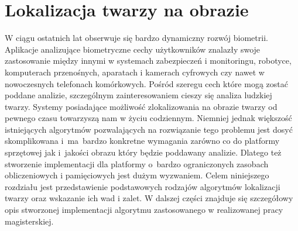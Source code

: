 \section{Lokalizacja twarzy na obrazie}
\label{sec:face-detect}
W ciągu ostatnich lat obserwuje się bardzo dynamiczny rozwój biometrii.
Aplikacje analizujące biometryczne cechy użytkowników znalazły swoje
zastosowanie między innymi w systemach zabezpieczeń i monitoringu, robotyce,
komputerach przenośnych, aparatach i kamerach cyfrowych czy nawet w nowoczesnych
telefonach komórkowych. Pośród szeregu cech które mogą zostać poddane analizie,
szczególnym zainteresowaniem cieszy się analiza ludzkiej twarzy. Systemy
posiadające możliwość zlokalizowania na obrazie twarzy od pewnego czasu
towarzyszą nam w życiu codziennym. Niemniej jednak większość istniejących
algorytmów pozwalających na rozwiązanie tego problemu jest
dosyć skomplikowana i~ma~bardzo konkretne wymagania zarówno co do platformy sprzętowej
jak i~jakości obrazu który będzie poddawany analizie. Dlatego też stworzenie
implementacji dla platformy o~bardzo ograniczonych zasobach obliczeniowych i
pamięciowych jest dużym wyzwaniem. Celem niniejszego rozdziału jest
przedstawienie podstawowych rodzajów algorytmów lokalizacji twarzy oraz
wskazanie ich wad i zalet. W dalszej części znajduje się szczegółowy opis
stworzonej implementacji algorytmu zastosowanego w realizowanej pracy magisterskiej.

